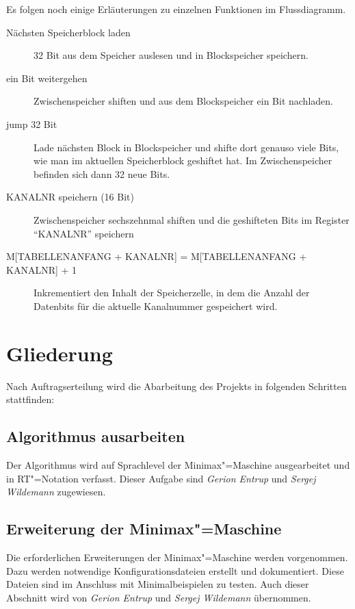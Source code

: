 \clearpage

Es folgen noch einige Erläuterungen zu einzelnen Funktionen im Flussdiagramm.

\begin{description}
    \item[{Nächsten Speicherblock laden}] 32 Bit aus dem Speicher auslesen und in Blockspeicher speichern.
    
    \item[{ein Bit weitergehen}] Zwischenspeicher shiften und aus dem Blockspeicher ein Bit nachladen.
    
    \item[{jump 32 Bit}] Lade nächsten Block in Blockspeicher und shifte dort genauso viele Bits, wie man im aktuellen Speicherblock geshiftet hat. Im Zwischenspeicher befinden sich dann 32 neue Bits.
    
    \item[{KANALNR speichern (16 Bit)}] Zwischenspeicher sechszehnmal shiften und die geshifteten Bits im Register "`KANALNR"' speichern
    
    \item[{M[TABELLENANFANG + KANALNR] = M[TABELLENANFANG + KANALNR] + 1}] Inkrementiert den Inhalt der Speicherzelle, in dem die Anzahl der Datenbits für die aktuelle Kanalnummer gespeichert wird.
\end{description}


\section{Gliederung}
\label{section:Pflichtenheft-SystemtechnischeLoesung-Gliederung}

Nach Auftragserteilung wird die Abarbeitung des Projekts in folgenden Schritten stattfinden:

\subsection{Algorithmus ausarbeiten}
Der Algorithmus wird auf Sprachlevel der Minimax"=Maschine ausgearbeitet und in RT"=Notation verfasst. Dieser Aufgabe sind \emph{Gerion Entrup} und \emph{Sergej Wildemann} zugewiesen.

\subsection{Erweiterung der Minimax"=Maschine}
Die erforderlichen Erweiterungen der Minimax"=Maschine werden vorgenommen. Dazu werden notwendige Konfigurationsdateien erstellt und dokumentiert. Diese Dateien sind im Anschluss mit Minimalbeispielen zu testen. Auch dieser Abschnitt wird von \emph{Gerion Entrup} und \emph{Sergej Wildemann} übernommen.

